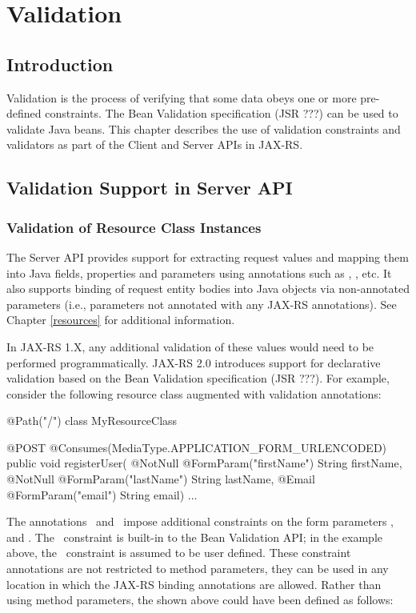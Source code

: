 \chapter{Validation}
\label{validation}

\section{Introduction}
\label{introduction}
Validation is the process of verifying that some data obeys one or more pre-defined constraints. The Bean Validation specification (JSR ???) can be used to validate Java beans. This chapter describes the use of validation constraints and validators as part of the Client and Server APIs in JAX-RS.

\section{Validation Support in Server API}

\subsection{Validation of Resource Class Instances}

The Server API provides support for extracting request values and mapping them into Java fields, properties and parameters using annotations such as , , etc. It also supports binding of request entity bodies into Java objects via non-annotated parameters (i.e., parameters not annotated with any JAX-RS annotations). See Chapter \ref{resources} for additional information.

In JAX-RS 1.X, any additional validation of these values would need to be performed programmatically. JAX-RS 2.0 introduces support for declarative validation based on the Bean Validation specification (JSR ???). For example, consider the following resource class augmented with validation annotations:

\begin{listing}{1}
@Path("/")
class MyResourceClass {

    @POST
    @Consumes(MediaType.APPLICATION_FORM_URLENCODED)
    public void registerUser(
        @NotNull @FormParam("firstName") String firstName,
        @NotNull @FormParam("lastName") String lastName,
        @Email @FormParam("email") String email) {
        ...
    }
}
\end{listing}

The annotations \NotNull\ and \Email\ impose additional constraints on the form parameters ,  and . The \NotNull\ constraint is built-in to the Bean Validation API; in the example above, the \Email\ constraint is assumed to be user defined. These constraint annotations are not restricted to method parameters, they can be used in any location in which the JAX-RS binding annotations are allowed. Rather than using method parameters, the  shown above could have been defined as follows:

